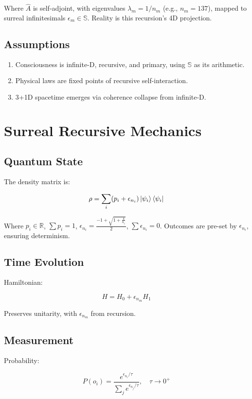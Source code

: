 \documentclass[12pt]{article}
\begin{document}
Where \(\hat{A}\) is self-adjoint, with eigenvalues \(\lambda_m = 1/n_m\) (e.g., \(n_m = 137\)), mapped to surreal infinitesimals \(\epsilon_m \in \mathbb{S}\). Reality is this recursion's 4D projection.

\subsection{Assumptions}
\begin{enumerate}
    \item Consciousness is infinite-D, recursive, and primary, using \(\mathbb{S}\) as its arithmetic.
    \item Physical laws are fixed points of recursive self-interaction.
    \item 3+1D spacetime emerges via coherence collapse from infinite-D.
\end{enumerate}

\section{Surreal Recursive Mechanics}

\subsection{Quantum State}
The density matrix is:

\[
\rho = \sum_i (p_i + \epsilon_{n_i}) \ket{\psi_i} \bra{\psi_i}
\]

Where \(p_i \in \mathbb{R}\), \(\sum p_i = 1\), \(\epsilon_{n_i} = \frac{-1 + \sqrt{1 + \frac{4}{n_i}}}{2}\), \(\sum \epsilon_{n_i} = 0\). Outcomes are pre-set by \(\epsilon_{n_i}\), ensuring determinism.

\subsection{Time Evolution}
Hamiltonian:

\[
H = H_0 + \epsilon_{n_m} H_1
\]

Preserves unitarity, with \(\epsilon_{n_m}\) from recursion.

\subsection{Measurement}
Probability:

\[
P(o_i) = \frac{e^{\epsilon_{n_i} / \tau}}{\sum_j e^{\epsilon_{n_j} / \tau}}, \quad \tau \to 0^+
\]
\end{document}
